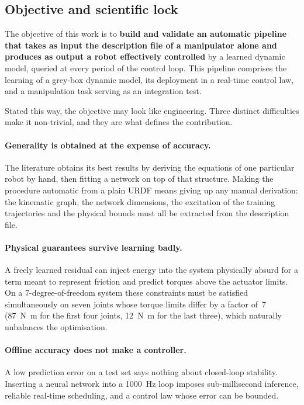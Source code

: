 \documentclass[a4paper, oneside]{article}
\begin{document}
\subsection{Objective and scientific lock}
\label{sec-verrou}

The objective of this work is to \textbf{build and validate an automatic
pipeline that takes as input the description file of a manipulator alone and
produces as output a robot effectively controlled} by a learned dynamic model,
queried at every period of the control loop. This pipeline comprises the
learning of a grey-box dynamic model, its deployment in a real-time control
law, and a manipulation task serving as an integration test.

Stated this way, the objective may look like engineering. Three distinct
difficulties make it non-trivial, and they are what defines the contribution.

\paragraph{Generality is obtained at the expense of accuracy.}
The literature obtains its best results by deriving the equations of one
particular robot by hand, then fitting a network on top of that structure.
Making the procedure automatic from a plain URDF means giving up any manual
derivation: the kinematic graph, the network dimensions, the excitation of the
training trajectories and the physical bounds must all be extracted from the
description file.

\paragraph{Physical guarantees survive learning badly.}
A freely learned residual can inject energy into the system  physically
absurd for a term meant to represent friction  and predict torques above the
actuator limits. On a 7-degree-of-freedom system these constraints must be
satisfied simultaneously on seven joints whose torque limits differ by a factor
of~7 (\SI{87}{\newton\meter} for the first four joints, \SI{12}{\newton\meter}
for the last three), which naturally unbalances the optimisation.

\paragraph{Offline accuracy does not make a controller.}
A low prediction error on a test set says nothing about closed-loop stability.
Inserting a neural network into a \SI{1000}{\hertz} loop imposes sub-millisecond
inference, reliable real-time scheduling, and a control law whose error can be
bounded.
\end{document}
